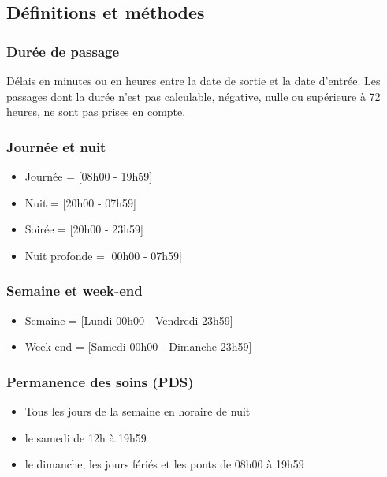 \documentclass[]{article}
\begin{document}
\subsection{Définitions et méthodes}\label{definitions-et-methodes}

\subsubsection{Durée de passage}\label{duree-de-passage-1}

Délais en minutes ou en heures entre la date de sortie et la date
d'entrée. Les passages dont la durée n'est pas calculable, négative,
nulle ou supérieure à 72 heures, ne sont pas prises en compte.

\subsubsection{Journée et nuit}\label{journee-et-nuit}

\begin{itemize}
\itemsep1pt\parskip0pt
\item
  Journée = {[}08h00 - 19h59{]}
\item
  Nuit = {[}20h00 - 07h59{]}
\item
  Soirée = {[}20h00 - 23h59{]}
\item
  Nuit profonde = {[}00h00 - 07h59{]}
\end{itemize}

\subsubsection{Semaine et week-end}\label{semaine-et-week-end}

\begin{itemize}
\itemsep1pt\parskip0pt
\item
  Semaine = {[}Lundi 00h00 - Vendredi 23h59{]}
\item
  Week-end = {[}Samedi 00h00 - Dimanche 23h59{]}
\end{itemize}

\subsubsection{Permanence des soins
(PDS)}\label{permanence-des-soins-pds}

\begin{itemize}
\itemsep1pt\parskip0pt
\item
  Tous les jours de la semaine en horaire de nuit
\item
  le samedi de 12h à 19h59
\item
  le dimanche, les jours fériés et les ponts de 08h00 à 19h59
\end{itemize}
\end{document}
